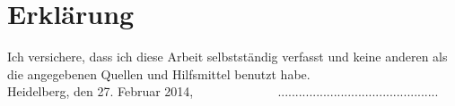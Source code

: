 \documentclass{article}
\begin{document}
\newpage
{}
\setcounter{page}{7}



\newpage
\section*{Erkl\"{a}rung}

Ich versichere, dass ich diese Arbeit selbstst\"{a}ndig verfasst und keine anderen als die angegebenen Quellen und Hilfsmittel benutzt habe.
\vspace{2cm}
\\
Heidelberg, den 27. Februar 2014,  $\;\;\;\;\;\;\;\;\;\;\;\;\;\;\;\;\;\;\;\;\;\;\;$..............................................

\end{document}
